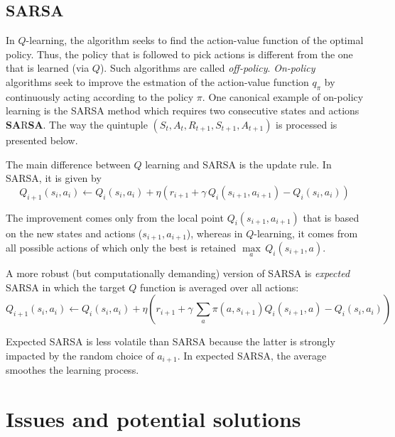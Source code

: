 \documentclass[]{krantz}
\theoremstyle{definition}
\theoremstyle{definition}
\theoremstyle{definition}
\theoremstyle{remark}
\begin{document}
\hypertarget{sarsa}{%
\subsection{SARSA}\label{sarsa}}

In \(Q\)-learning, the algorithm seeks to find the action-value function
of the optimal policy. Thus, the policy that is followed to pick actions
is different from the one that is learned (via \(Q\)). Such algorithms
are called \emph{off-policy}. \emph{On-policy} algorithms seek to
improve the estmation of the action-value function \(q_\pi\) by
continuously acting according to the policy \(\pi\). One canonical
example of on-policy learning is the SARSA method which requires two
consecutive states and actions \textbf{SA}R\textbf{SA}. The way the
quintuple \((S_t,A_t,R_{t+1}, S_{t+1}, A_{t+1})\) is processed is
presented below.

The main difference between \(Q\) learning and SARSA is the update rule.
In SARSA, it is given by \begin{equation}
\label{eq:SARSAupdate}
Q_{i+1}(s_i,a_i) \longleftarrow Q_i(s_i,a_i) + \eta  \left(r_{i+1}+\gamma \, Q_i(s_{i+1},a_{i+1})-Q_i(s_i,a_i) \right)
\end{equation}

The improvement comes only from the local point \(Q_i(s_{i+1},a_{i+1})\)
that is based on the new states and actions (\(s_{i+1},a_{i+1}\)),
whereas in \(Q\)-learning, it comes from all possible actions of which
only the best is retained \(\underset{a}{\max} \, Q_i(s_{i+1},a)\).

A more robust (but computationally demanding) version of SARSA is
\emph{expected} SARSA in which the target \(Q\) function is averaged
over all actions: \begin{equation}
\label{eq:exSARSAupdate}
Q_{i+1}(s_i,a_i) \longleftarrow Q_i(s_i,a_i) + \eta  \left(r_{i+1}+\gamma \, \sum_a \pi(a,s_{i+1}) Q_i(s_{i+1},a) -Q_i(s_i,a_i) \right)
\end{equation}

Expected SARSA is less volatile than SARSA because the latter is
strongly impacted by the random choice of \(a_{i+1}\). In expected
SARSA, the average smoothes the learning process.

\hypertarget{issues-and-potential-solutions}{%
\section{Issues and potential
solutions}\label{issues-and-potential-solutions}}
\end{document}
